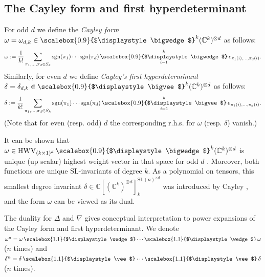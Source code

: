 \documentclass[12pt, reqno]{amsart}
\theoremstyle{definition}
\newcommand{\sgn}{\mathrm{sgn}}
\let\oldbigwedge\bigwedge
\let\oldbigvee\bigvee
\let\oldwedge\wedge
\let\oldvee\vee
\renewcommand{\bigwedge}{
  \mathop{
    \vcenter{
      \hbox{\scalebox{0.9}{$\displaystyle\oldbigwedge$}}
    }
  }
}
\renewcommand{\bigvee}{
  \mathop{
    \vcenter{
      \hbox{\scalebox{0.9}{$\displaystyle\oldbigvee$}}
    }
  }
}
\renewcommand{\wedge}{
  \mathop{
    \vcenter{
      \hbox{\scalebox{1.1}{$\displaystyle\oldwedge$}}
    }
  }
}
\renewcommand{\vee}{
  \mathop{
    \vcenter{
      \hbox{\scalebox{1.1}{$\displaystyle\oldvee$}}
    }
  }
}
\begin{document}


\subsection{The Cayley form and first hyperdeterminant} 
For odd $d$ we define the \textit{Cayley form} $\omega = \omega_{d,k} \in \bigwedge^k (\mathbb{C}^k)^{\otimes d}$ as follows:
$$
    \omega := \frac{1}{k!} \sum_{\pi_1,\ldots, \pi_d \in S_k} \sgn(\pi_1)\cdots\sgn(\pi_d) \bigwedge_{i=1}^k e_{\pi_1(i),\ldots,\pi_d(i)}. %
$$
Similarly, for even $d$ we define {\it Cayley's first hyperdeterminant} $\delta = \delta_{d,k} \in \bigvee^k (\mathbb{C}^k)^{\otimes d}$ as follows: 
$$
\delta := \frac{1}{k!} \sum_{\pi_1,\ldots, \pi_d \in S_k} \sgn(\pi_1)\cdots\sgn(\pi_d) \bigvee_{i=1}^k e_{\pi_1(i),\ldots,\pi_d(i)}.
$$
(Note that for even (resp. odd) $d$ the corresponding r.h.s. for $\omega$ (resp. $\delta$) vanish.)


\vspace{0.5em}

It can be shown that $\omega \in \mathrm{HWV}_{(k \times 1)^d}\bigwedge^k (\mathbb{C}^k)^{\otimes d}$ is unique (up scalar) highest weight vector in that space for odd $d$ \cite{ayfund}. Moreover, both functions are unique SL-invariants of degree $k$. As a polynomial on tensors, this smallest degree invariant $\delta \in \mathbb{C}[(\mathbb{C}^k)^{\otimes d}]^{\mathrm{SL}(n)^{\times d}}_{k}$ was introduced by Cayley \cite{cay, cay2}, and the form $\omega$ can be viewed as its dual.   %

\vspace{0.5em}

The duality for $\Delta$ and $\nabla$ gives conceptual interpretation to power expansions of the Cayley form and first hyperdeterminant. We denote $\omega^n = \omega \wedge \cdots \wedge \omega$ ($n$ times) and $\delta^n = \delta \vee \cdots \vee \delta$ ($n$ times). 

\vspace{0.5em}
\end{document}
